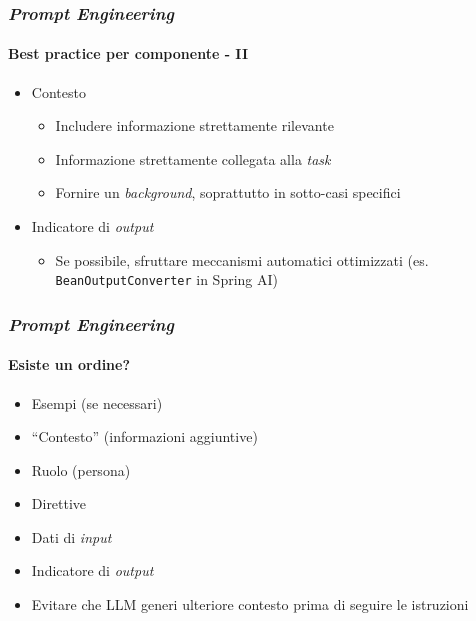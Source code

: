 %
\begin{frame}[t] \frametitle{\emph{Prompt Engineering}}
\framesubtitle{Best practice per componente - II}
\vspace*{-15pt}
{\small
{}
    \begin{minipage}[t]{\textwidth}
        \begin{itemize}[leftmargin=10pt,align=right]
            \item[\alert{\faArrowCircleRight}] Contesto
            \begin{itemize}[leftmargin=10pt,align=right]
                \item[\alert{\faExclamationTriangle}] Includere informazione strettamente rilevante
                \item[\alert{\faExclamationTriangle}] Informazione strettamente collegata alla \textit{task}
                \item[\alert{\faExclamationTriangle}] Fornire un \textit{background}, soprattutto in sotto-casi specifici
            \end{itemize}
            \item[\alert{\faArrowCircleRight}] Indicatore di \textit{output}
            \begin{itemize}[leftmargin=10pt,align=right]
                \item[\alert{\faExclamationTriangle}] Se possibile, sfruttare meccanismi automatici ottimizzati (es. \texttt{BeanOutputConverter} in Spring AI)
            \end{itemize}
        \end{itemize}        
    \end{minipage}
}
\end{frame}
%
\begin{frame}[t] \frametitle{\emph{Prompt Engineering}}
\framesubtitle{Esiste un ordine?}
{\normalsize
    \begin{minipage}[t]{\textwidth}
        \begin{itemize}[leftmargin=10pt,align=right]
            \item[\alertedcircled{1}] Esempi (se necessari)
            \item[\alertedcircled{2}] ``Contesto'' (informazioni aggiuntive)
            \item[\alertedcircled{3}] Ruolo (persona)
            \item[\alertedcircled{4}] Direttive
            \item[\alertedcircled{5}] Dati di \textit{input}
            \item[\alertedcircled{6}] Indicatore di \textit{output}
        \end{itemize}        
    \end{minipage}
    \begin{itemize}[leftmargin=10pt,align=right]
        \item[\alert{\faExclamationTriangle}] Evitare che LLM generi \alert{ulteriore contesto} prima di seguire le istruzioni 
    \end{itemize}
}
\end{frame}
